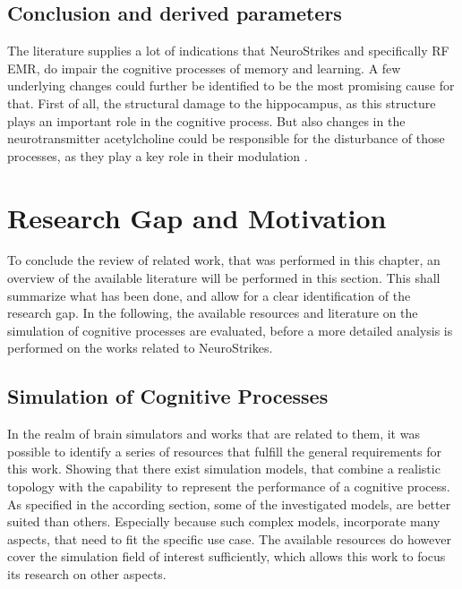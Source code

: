     
    \subsection{Conclusion and derived parameters}
    The literature supplies a lot of indications that NeuroStrikes and specifically RF EMR, do impair the cognitive processes of memory and learning. A few underlying changes could further be identified to be the most promising cause for that. First of all, the structural damage to the hippocampus, as this structure plays an important role in the cognitive process. But also changes in the neurotransmitter acetylcholine could be responsible for the disturbance of those processes, as they play a key role in their modulation \cite{Aussel.2018}.
    

\section{Research Gap and Motivation}
To conclude the review of related work, that was performed in this chapter, an overview of the available literature will be performed in this section. This shall summarize what has been done, and allow for a clear identification of the research gap. In the following, the available resources and literature on the simulation of cognitive processes are evaluated, before a more detailed analysis is performed on the works related to NeuroStrikes.

    \subsection{Simulation of Cognitive Processes}
    In the realm of brain simulators and works that are related to them, it was possible to identify a series of resources that fulfill the general requirements for this work. Showing that there exist simulation models, that combine a realistic topology with the capability to represent the performance of a cognitive process. As specified in the according section, some of the investigated models, are better suited than others. Especially because such complex models, incorporate many aspects, that need to fit the specific use case. The available resources do however cover the simulation field of interest sufficiently, which allows this work to focus its research on other aspects. 
    

